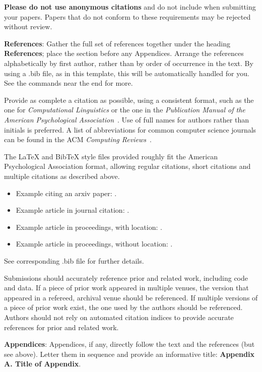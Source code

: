 \documentclass{article}
\begin{document}
\textbf{Please do not use anonymous citations} and do not include
 when submitting your papers. Papers that do not
conform to these requirements may be rejected without review.

\textbf{References}: Gather the full set of references together under
the heading {\bf References}; place the section before any Appendices. 
Arrange the references alphabetically
by first author, rather than by order of occurrence in the text.
By using a .bib file, as in this template, this will be automatically 
handled for you. See the \verb|| commands near the end for more.

Provide as complete a citation as possible, using a consistent format,
such as the one for {\em Computational Linguistics\/} or the one in the 
{\em Publication Manual of the American 
Psychological Association\/}~\cite{APA:83}. Use of full names for
authors rather than initials is preferred. A list of abbreviations
for common computer science journals can be found in the ACM 
{\em Computing Reviews\/}~\cite{ACM:83}.

The \LaTeX{} and Bib\TeX{} style files provided roughly fit the
American Psychological Association format, allowing regular citations, 
short citations and multiple citations as described above.  

\begin{itemize}
\item Example citing an arxiv paper: \cite{rasooli-tetrault-2015}. 
\item Example article in journal citation: \cite{Ando2005}.
\item Example article in proceedings, with location: \cite{borsch2011}.
\item Example article in proceedings, without location: \cite{andrew2007scalable}.
\end{itemize}
See corresponding .bib file for further details.

Submissions should accurately reference prior and related work, including code and data. If a piece of prior work appeared in multiple venues, the version that appeared in a refereed, archival venue should be referenced. If multiple versions of a piece of prior work exist, the one used by the authors should be referenced. Authors should not rely on automated citation indices to provide accurate references for prior and related work.

{\bf Appendices}: Appendices, if any, directly follow the text and the
references (but see above).  Letter them in sequence and provide an
informative title: {\bf Appendix A. Title of Appendix}.
\end{document}
